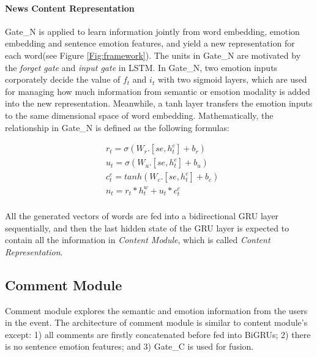 \documentclass{article}
\newcommand{\kai}[1]{\textcolor{blue}{Kai: {#1}}}
\begin{document}
	\paragraph{News Content Representation}
	Gate\_N is applied to learn information jointly from word embedding, emotion embedding and sentence emotion features, and yield a new representation for each word(see Figure \ref{Fig:framework}). The units in Gate\_N are motivated by the \textit{forget gate} and \textit{input gate} in LSTM. In Gate\_N, two emotion inputs corporately decide the value of $f_t$ and $i_t$ with two sigmoid layers, which are used for managing how much information from semantic or emotion modality is added into the new representation. Meanwhile, a tanh layer transfers the emotion inputs to the same dimensional space of word embedding. Mathematically, the relationship in Gate\_N is defined as the following formulas:
	
	\begin{equation}
	\begin{aligned}
	&r_t = \sigma(W_r.[se, h^e_t] + b_r)\\
	&u_t = \sigma(W_u.[se, h^e_t] + b_u)\\
	&c_t^e = tanh(W_c.[se, h^e_t] + b_c)\\
	&n_t = r_t * h^w_t + u_t * c_t^e\\
	\end{aligned}
	\end{equation}
	
	All the generated vectors of words are fed into a bidirectional GRU layer sequentially, and then the last hidden state of the GRU layer is expected to contain all the information in {\em Content Module}, which is called {\em Content Representation}.
	
	\subsection{Comment Module}
	Comment module explores the semantic and emotion information from the users in the event. The architecture of comment module is similar to content module's except: 1) all comments are firstly concatenated before fed into BiGRUs; 2) there is no sentence emotion features; and 3) Gate\_C is used for fusion.
	
\end{document}
